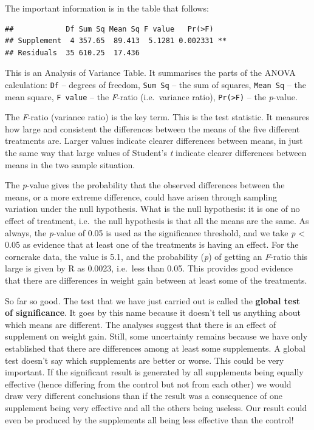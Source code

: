\documentclass[
]{book}
\begin{document}
The important information is in the table that follows:

\begin{verbatim}
##            Df Sum Sq Mean Sq F value   Pr(>F)    
## Supplement  4 357.65  89.413  5.1281 0.002331 ** 
## Residuals  35 610.25  17.436
\end{verbatim}

This is an Analysis of Variance Table. It summarises the parts of the ANOVA calculation: \texttt{Df} -- degrees of freedom, \texttt{Sum\ Sq} -- the sum of squares, \texttt{Mean\ Sq} -- the mean square, \texttt{F\ value} -- the \emph{F}-ratio (i.e.~variance ratio), \texttt{Pr(\textgreater{}F)} -- the \emph{p}-value.

The \emph{F}-ratio (variance ratio) is the key term. This is the test statistic. It measures how large and consistent the differences between the means of the five different treatments are. Larger values indicate clearer differences between means, in just the same way that large values of Student's \emph{t} indicate clearer differences between means in the two sample situation.

The \emph{p}-value gives the probability that the observed differences between the means, or a more extreme difference, could have arisen through sampling variation under the null hypothesis. What is the null hypothesis: it is one of no effect of treatment, i.e.~the null hypothesis is that all the means are the same. As always, the \emph{p}-value of 0.05 is used as the significance threshold, and we take \emph{p} \textless{} 0.05 as evidence that at least one of the treatments is having an effect. For the corncrake data, the value is 5.1, and the probability (\emph{p}) of getting an \emph{F}-ratio this large is given by R as 0.0023, i.e.~less than 0.05. This provides good evidence that there are differences in weight gain between at least some of the treatments.

So far so good. The test that we have just carried out is called the \textbf{global test of significance}. It goes by this name because it doesn't tell us anything about which means are different. The analyses suggest that there is an effect of supplement on weight gain. Still, some uncertainty remains because we have only established that there are differences among at least some supplements. A global test doesn't say which supplements are better or worse. This could be very important. If the significant result is generated by all supplements being equally effective (hence differing from the control but not from each other) we would draw very different conclusions than if the result was a consequence of one supplement being very effective and all the others being useless. Our result could even be produced by the supplements all being less effective than the control!
\end{document}
